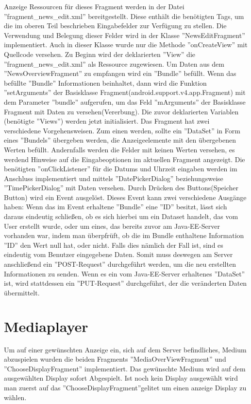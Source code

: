 Anzeige Ressourcen für dieses Fragment werden in der Datei ''fragment\_news\_edit.xml'' bereitgestellt. Diese enthält die benötigten Tags, um die im oberen Teil beschrieben Eingabefelder zur Verfügung zu stellen. Die Verwendung und Belegung dieser Felder wird in der Klasse ''NewsEditFragment'' implementiert. Auch in dieser Klasse wurde nur die Methode ''onCreateView'' mit Quellcode versehen. Zu Beginn wird der deklarierten ''View'' die ''fragment\_news\_edit.xml'' als Ressource zugewiesen. Um Daten aus dem ''NewsOverviewFragment'' zu empfangen wird ein ''Bundle'' befüllt. Wenn das befüllte ''Bundle'' Informationen beinhaltet, dann wird die Funktion ''setArguments'' der Basisklasse Fragment(android.support.v4.app.Fragment) mit dem Parameter ''bundle'' aufgerufen, um das Feld ''mArguments'' der Basisklasse Fragment mit Daten zu versehen(Vererbung). Die zuvor deklarierten Variablen (benötigte ''Views'') werden jetzt initialisiert. Das Fragment hat zwei verschiedene Vorgehensweisen. Zum einen werden, sollte ein ''DataSet'' in Form eines ''Bundels'' übergeben werden, die Anzeigeelemente mit den übergebenen Werten befüllt. Andernfalls werden die Felder mit keinen Werten versehen, es werdend Hinweise auf die Eingabeoptionen im aktuellen Fragment angezeigt. Die benötigten ''onClickListener'' für die Datums und Uhrzeit eingaben werden im Anschluss implementiert und mittels ''DatePickerDialog'' beziehungsweise ''TimePickerDialog'' mit Daten versehen. Durch Drücken des Buttons(Speicher Button) wird ein Event ausgelöst. Dieses Event kann zwei verschiedene Ausgänge haben: Wenn das im Event erhaltene ''Bundle'' eine ''ID'' besitzt, lässt sich daraus eindeutig schließen, ob es sich hierbei um ein Dataset handelt, das vom User erstellt wurde, oder um eines, das bereits zuvor am Java-EE-Server vorhanden war, indem man überpfrüft, ob die im Bundle enthaltene Information ''ID'' den Wert null hat, oder nicht. Falls dies nämlich der Fall ist, sind es eindeutig vom Benutzer eingegebene Daten. Somit muss deswegen am Server anschließend ein ''POST-Request'' durchgeführt werden, um die neu erstellten Informationen zu senden.
Wenn es ein vom Java-EE-Server erhaltenes ''DataSet'' ist, wird stattdessen ein ''PUT-Request'' durchgeführt, der die veränderten Daten übermittelt.  
\section{Mediaplayer}
Um auf einer gewünschten Anzeige ein, sich auf dem Server befindliches, Medium abzuspielen wurden die beiden Fragments ''MediaOverViewFragment'' und ''ChooseDisplayFragment'' implementiert. Das gewünschte Medium wird auf dem ausgewählten Display sofort Abgespielt. Ist noch kein Display ausgewählt wird man zuerst auf das ''ChooseDisplayFragment''gelitet um einen anzeige Display zu wählen.
